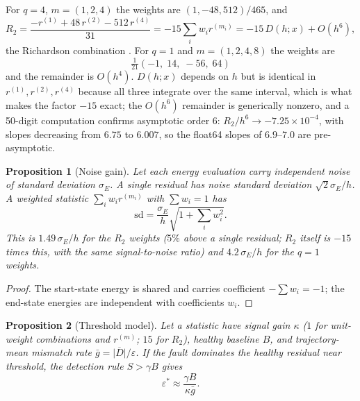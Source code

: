 \documentclass[10pt]{article}
\newtheorem{proposition}{Proposition}
\theoremstyle{definition}
\begin{document}
For $q=4$, $m=(1,2,4)$ the weights are $(1,-48,512)/465$, and
\begin{equation}\label{eq:R2}
  R_2=\frac{-r^{(1)}+48\,r^{(2)}-512\,r^{(4)}}{31}
  =-15\sum_iw_ir^{(m_i)}=-15\,D(h;x)+O(h^6),
\end{equation}
the Richardson combination \citep{richardson1927}. For $q=1$ and
$m=(1,2,4,8)$ the weights are
\[\tfrac1{21}(-1,\;14,\;-56,\;64)\]
and the remainder is $O(h^4)$.
$D(h;x)$ depends on $h$ but is identical in $r^{(1)},r^{(2)},r^{(4)}$ because all three integrate over the same
interval, which is what makes the factor $-15$ exact; the $O(h^6)$ remainder is generically nonzero, and a 50-digit
computation confirms asymptotic order $6$: $R_2/h^6\to-7.25\times10^{-4}$, with slopes decreasing from $6.75$ to $6.007$,
so the float64 slopes of $6.9$--$7.0$ are pre-asymptotic.

\begin{proposition}[Noise gain]\label{prop:noise}
Let each energy evaluation carry independent noise of standard deviation
$\sigma_E$. A single residual has noise standard deviation $\sqrt2\sigma_E/h$.
A weighted statistic $\sum_iw_ir^{(m_i)}$ with $\sum w_i=1$ has
\begin{equation}
  \mathrm{sd}=\frac{\sigma_E}{h}\sqrt{1+\textstyle\sum_iw_i^2}.
\end{equation}
This is $1.49\,\sigma_E/h$ for the $R_2$ weights ($5\%$ above a single
residual; $R_2$ itself is $-15$ times this, with the same signal-to-noise
ratio) and $4.2\,\sigma_E/h$ for the $q=1$ weights.
\end{proposition}

\begin{proof}
The start-state energy is shared and carries coefficient $-\sum w_i=-1$; the
end-state energies are independent with coefficients $w_i$.
\end{proof}

\begin{proposition}[Threshold model]\label{prop:thr}
Let a statistic have signal gain $\kappa$ ($1$ for unit-weight combinations and
$r^{(m)}$; $15$ for $R_2$), healthy baseline $B$, and trajectory-mean mismatch
rate $\bar g=\overline{|D|}/\varepsilon$. If the fault dominates the healthy
residual near threshold, the detection rule $S>\gamma B$ gives
\begin{equation}\label{eq:thr}
  \varepsilon^*\approx\frac{\gamma B}{\kappa\bar g}.
\end{equation}
\end{proposition}
\end{document}
